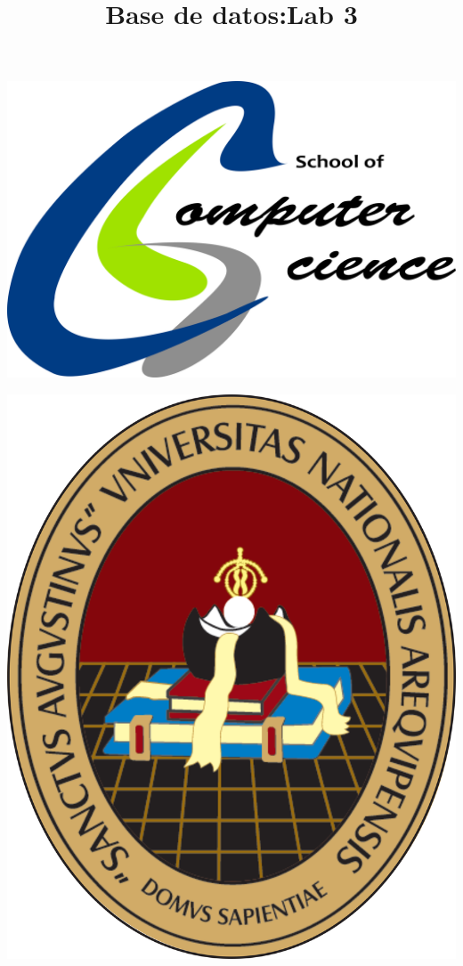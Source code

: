 \documentclass[11pt]{article}
\title{Base de datos:Lab 3}
\begin{document}
\begin{center}																		%
\newcommand{\HRule}{\rule{\linewidth}{0.5mm}}									%
\begin{minipage}{0.48\textwidth} \begin{flushleft}
\includegraphics[scale = 0.014]{logo_escuela}
\end{flushleft}\end{minipage}
\begin{minipage}{0.48\textwidth} \begin{flushright}
\includegraphics[scale = 0.14]{logo_unsa}
\end{flushright}\end{minipage}


\end{center}
\end{document}
